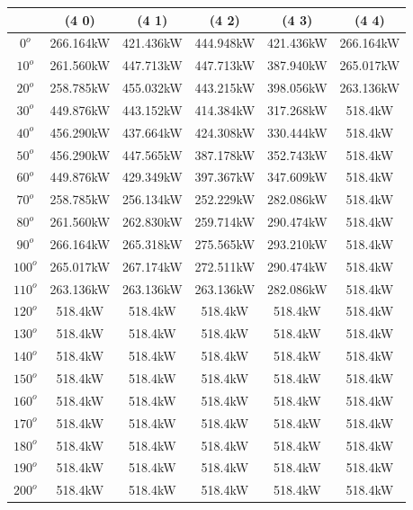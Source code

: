         \begin{table}[H]
        	\centering
        	\begin{tabular}{|c|c|c|c|c|c|} \hline
        			& (4 0)		& (4 1)		& (4 2)		& (4 3)		& (4 4)		\\ \hline
		$0^o$	& 266.164kW	& 421.436kW	& 444.948kW	& 421.436kW	& 266.164kW	\\ \hline
		$10^o$	& 261.560kW	& 447.713kW	& 447.713kW	& 387.940kW	& 265.017kW	\\ \hline
		$20^o$	& 258.785kW	& 455.032kW	& 443.215kW	& 398.056kW	& 263.136kW	\\ \hline
		$30^o$	& 449.876kW	& 443.152kW	& 414.384kW	& 317.268kW	& 518.4kW	\\ \hline
		$40^o$	& 456.290kW	& 437.664kW	& 424.308kW	& 330.444kW	& 518.4kW	\\ \hline
		$50^o$	& 456.290kW	& 447.565kW	& 387.178kW	& 352.743kW	& 518.4kW	\\ \hline
		$60^o$	& 449.876kW	& 429.349kW	& 397.367kW	& 347.609kW	& 518.4kW	\\ \hline
		$70^o$	& 258.785kW	& 256.134kW	& 252.229kW	& 282.086kW	& 518.4kW	\\ \hline
		$80^o$	& 261.560kW	& 262.830kW	& 259.714kW	& 290.474kW	& 518.4kW	\\ \hline
		$90^o$	& 266.164kW	& 265.318kW	& 275.565kW	& 293.210kW	& 518.4kW	\\ \hline
		$100^o$	& 265.017kW	& 267.174kW	& 272.511kW	& 290.474kW	& 518.4kW	\\ \hline
		$110^o$	& 263.136kW	& 263.136kW	& 263.136kW	& 282.086kW	& 518.4kW	\\ \hline
		$120^o$	& 518.4kW	& 518.4kW	& 518.4kW	& 518.4kW	& 518.4kW	\\ \hline
		$130^o$	& 518.4kW	& 518.4kW	& 518.4kW	& 518.4kW	& 518.4kW	\\ \hline
		$140^o$	& 518.4kW	& 518.4kW	& 518.4kW	& 518.4kW	& 518.4kW	\\ \hline
		$150^o$	& 518.4kW	& 518.4kW	& 518.4kW	& 518.4kW	& 518.4kW	\\ \hline
		$160^o$	& 518.4kW	& 518.4kW	& 518.4kW	& 518.4kW	& 518.4kW	\\ \hline
		$170^o$	& 518.4kW	& 518.4kW	& 518.4kW	& 518.4kW	& 518.4kW	\\ \hline
		$180^o$	& 518.4kW	& 518.4kW	& 518.4kW	& 518.4kW	& 518.4kW	\\ \hline
		$190^o$	& 518.4kW	& 518.4kW	& 518.4kW	& 518.4kW	& 518.4kW	\\ \hline
		$200^o$	& 518.4kW	& 518.4kW	& 518.4kW	& 518.4kW	& 518.4kW	\\ \hline

\end{tabular}
\end{table}
